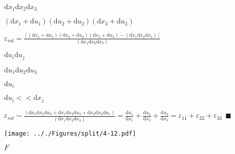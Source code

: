 \documentclass[onecolumn,11pt]{report}
\def\lthtmlcheckvsize{\ifdim\ht\sizebox<\vsize 
  \ifdim\wd\sizebox<\hsize\expandafter\hfill\fi \expandafter\vfill
  \else\expandafter\vss\fi}%
\begin{document}
{\newpage\clearpage
{}%
$ \mathrm{d} x_1 \mathrm{d} x_2 \mathrm{d} x_3$%
\lthtmlindisplaymathZ
\lthtmlcheckvsize\clearpage}

{\newpage\clearpage
{}%
$ (\mathrm{d} x_1 + \mathrm{d}u_1)(\mathrm{d} u_2 + \mathrm{d}u_2)(\mathrm{d} x_3 + \mathrm{d} u_3)$%
\lthtmlindisplaymathZ
\lthtmlcheckvsize\clearpage}

{\newpage\clearpage
{}%
$\displaystyle \varepsilon_{vol} =  \frac{[(\mathrm{d} x_1 + \mathrm{d}u_1)(\mathrm{d} x_2 + \mathrm{d}u_2)(\mathrm{d} x_3 + \mathrm{d}u_3) - (\mathrm{d} x_1 \mathrm{d} x_2 \mathrm{d} x_3)]}{(\mathrm{d} x_1 \mathrm{d} x_2 \mathrm{d} x_3)}
$%
\lthtmlindisplaymathZ
\lthtmlcheckvsize\clearpage}

{\newpage\clearpage
{}%
$ \mathrm{d}u_i \mathrm{d}u_j$%
\lthtmlindisplaymathZ
\lthtmlcheckvsize\clearpage}

{\newpage\clearpage
{}%
$ \mathrm{d}u_1 \mathrm{d}u_2 \mathrm{d}u_3$%
\lthtmlindisplaymathZ
\lthtmlcheckvsize\clearpage}

{\newpage\clearpage
{}%
$ \mathrm{d}u_i$%
\lthtmlindisplaymathZ
\lthtmlcheckvsize\clearpage}

{\newpage\clearpage
{}%
$ \mathrm{d}u_i << \mathrm{d}x_j $%
\lthtmlindisplaymathZ
\lthtmlcheckvsize\clearpage}

{\newpage\clearpage
{}%
$\displaystyle \varepsilon_{vol} \sim  \frac{(\mathrm{d} x_1 \mathrm{d} x_2 \mathrm{d}u_3 + 
							 \mathrm{d} x_1 \mathrm{d} x_3 \mathrm{d}u_2 +
							 \mathrm{d} x_2 \mathrm{d} x_3 \mathrm{d}u_1)}
							 {(\mathrm{d} x_1 \mathrm{d} x_2 \mathrm{d} x_3)}
				=  \frac{\mathrm{d}u_1}{\mathrm{d} x_1} + 
				   \frac{\mathrm{d}u_2}{\mathrm{d} x_2} + 
				   \frac{\mathrm{d}u_3}{\mathrm{d} x_3} 
				= \varepsilon_{11} + \varepsilon_{22} + \varepsilon_{33} \: \: \blacksquare
$%
\lthtmlindisplaymathZ
\lthtmlcheckvsize\clearpage}

{\newpage\clearpage
{}%
\texttt{[image: .././Figures/split/4-12.pdf]}%
\lthtmlpictureZ
\lthtmlcheckvsize\clearpage}

{\newpage\clearpage
{}%
$ F$%
\lthtmlindisplaymathZ
\lthtmlcheckvsize\clearpage}
\end{document}
